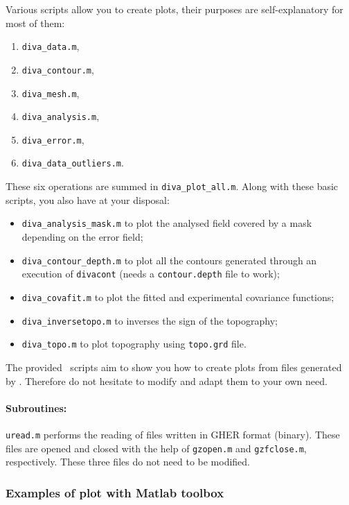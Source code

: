 Various scripts allow you to create plots, their purposes are self-explanatory for most of them:

\begin{enumerate}
\item \texttt{diva\_data.m},
\item \texttt{diva\_contour.m}, 
\item \texttt{diva\_mesh.m},
\item \texttt{diva\_analysis.m},
\item \texttt{diva\_error.m},
\item \texttt{diva\_data\_outliers.m}.
\end{enumerate}
\vspace{.25cm}

These six operations are summed in \texttt{diva\_plot\_all.m}. Along with these basic scripts, you also have at your disposal:
\begin{itemize}
\item \texttt{diva\_analysis\_mask.m} to plot the analysed field covered by a mask depending on the error field;
\item \texttt{diva\_contour\_depth.m} to plot all the contours generated through an execution of \texttt{divacont} (needs a \texttt{contour.depth} file to work);
\item \texttt{diva\_covafit.m} to plot the fitted and experimental covariance functions;
\item \texttt{diva\_inversetopo.m} to inverses the sign of the topography;
\item \texttt{diva\_topo.m} to plot topography using \texttt{topo.grd} file.
\end{itemize}

 
\btips
The provided \matlab\, scripts aim to show you how to create plots from files generated by \diva. Therefore do not hesitate to modify and adapt them to your own need.
\etips

\paragraph{Subroutines:} \texttt{uread.m} performs the reading of files written in GHER format (binary). These files are opened and closed with the help of \texttt{gzopen.m} and \texttt{gzfclose.m}, respectively. These three files do not need to be modified.


\subsubsection{Examples of plot with Matlab \diva toolbox}

